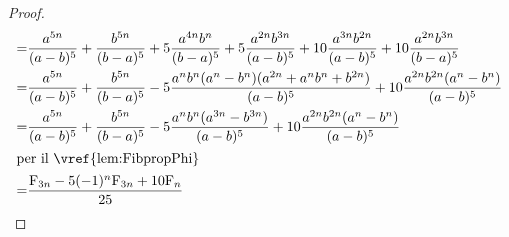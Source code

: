 \begin{proof}
\begin{align*}
=&\dfrac{a^{5n}}{(a-b)^5}+\dfrac{b^{5n}}{(b-a)^5}+5\dfrac{a^{4n}b^{n}}{(b-a)^5}+5\dfrac{a^{2n}b^{3n}}{(a-b)^5}+10\dfrac{a^{3n}b^{2n}}{(a-b)^5}+10\dfrac{a^{2n}b^{3n}}{(b-a)^5}\\
=&\dfrac{a^{5n}}{(a-b)^5}+\dfrac{b^{5n}}{(b-a)^5}-5\dfrac{a^nb^n(a^n-b^n)(a^{2n}+a^nb^n+b^{2n})}{(a-b)^5}+10\dfrac{a^{2n}b^{2n}(a^n-b^n)}{(a-b)^5}\\
=&\dfrac{a^{5n}}{(a-b)^5}+\dfrac{b^{5n}}{(b-a)^5}-5\dfrac{a^nb^n(a^{3n}-b^{3n})}{(a-b)^5}+10\dfrac{a^{2n}b^{2n}(a^n-b^n)}{(a-b)^5}\\
	\intertext{per il~\vref{lem:FibpropPhi}} 
=&\dfrac{\Fib{3n}-5(-1)^n\Fib{3n}+10\Fib{n}}{25}\\	
\end{align*}
\end{proof}